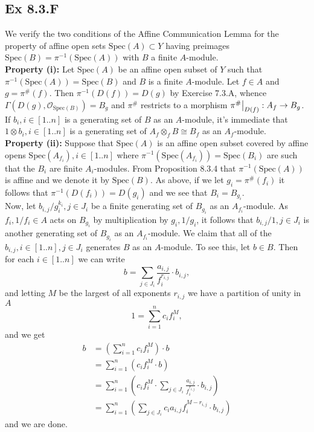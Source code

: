 \documentclass{article}
\newcommand\restr[2]{{%
  \left.\kern-\nulldelimiterspace %
  #1 %
  \vphantom{\big|} %
  \right|_{#2} %
  }}
\theoremstyle{definition}
\newcommand{\oo}{\mathcal{O}}
\newcommand{\osp}[1]{\oo_{\Spec\left(#1\right)}}
\newcommand{\Spec}{\text{Spec}}
\begin{document}
\subsection*{Ex 8.3.F}

We verify the two conditions of the Affine Communication Lemma for the property
of affine open sets $\Spec(A) \subset Y$ having preimages $\Spec(B) =
\pi^{-1}(\Spec(A))$ with $B$ a finite $A$-module. \\

\textbf{Property (i): }
Let $\Spec(A)$ be an affine open subset of $Y$ such that $\pi^{-1}(\Spec(A)) =
\Spec(B)$ and $B$ is a finite $A$-module. Let $f \in A$ and $g = \pi^{\#}(f)$.
Then $\pi^{-1}(D(f)) = D(g)$ by Exercise 7.3.A, whence $\Gamma(D(g), \osp{B}) =
B_g$ and $\pi^{\#}$ restricts to a morphism $\restr{\pi^{\#}}{D(f)} : A_f \to
B_g$. If $b_i, i \in [1..n]$ is a generating set of $B$ as an $A$-module, it's
immediate that $1 \otimes b_i, i \in [1..n]$ is a generating set of $A_f
\otimes_f B \cong B_f$ as an $A_f$-module. \\

\textbf{Property (ii): }
Suppose that $\Spec(A)$ is an affine open subset covered by affine opens
$\Spec(A_{f_i}), i \in [1..n]$ where $\pi^{-1}(\Spec(A_{f_i})) = \Spec(B_i)$
are such that the $B_i$ are finite $A_i$-modules. From Proposition 8.3.4 that
$\pi^{-1}(\Spec(A))$ is affine and we denote it by $\Spec(B)$. As above, if we
let $g_i = \pi^{\#}(f_i)$ it follows that $\pi^{-1}(D(f_i)) = D(g_i)$ and we
see that $B_i = B_{g_i}$. \\ 

Now, let $b_{i, j}/g_i^{k_i}, j \in J_i$ be a finite generating set of
$B_{g_i}$ as an $A_{f_i}$-module. As $f_i, 1/f_i \in A$ acts on $B_{g_i}$ by
multiplication by $g_i, 1/g_i$, it follows that $b_{i, j}/1, j \in J_i$ is
another generating set of $B_{g_i}$ as an $A_{f_i}$-module. We claim that all
of the $b_{i, j}, i \in [1..n], j \in J_i$ generates $B$ as an $A$-module. To see this,
let $b \in B$. Then for each $i \in [1..n]$ we can write 
\[
    b = \sum_{j \in J_i} \frac{a_{i, j}}{f_{i}^{r_{i, j}}} \cdot b_{i, j},
\]
and letting $M$ be the largest of all exponents $r_{i, j}$ we have a partition
of unity in $A$
\[
    1 = \sum_{i = 1}^{n} c_i f_i^{M},
\]
and we get
\begin{align*}
    b
    &=
    \left(\sum_{i = 1}^{n} c_i f_i^{M}\right)
    \cdot 
    b \\
    &=
    \sum_{i = 1}^{n} \left(c_i f_i^{M} \cdot b\right) \\
    &=
    \sum_{i = 1}^{n} \left(
        c_i f_i^{M} 
        \cdot 
        \sum_{j \in J_i} \frac{a_{i, j}}{f_{i}^{r_{i, j}}} \cdot b_{i, j}
    \right) \\
    &=
    \sum_{i = 1}^{n} \left(
        \sum_{j \in J_i} c_i a_{i, j}f_{i}^{M - r_{i, j}} \cdot b_{i, j}
    \right) 
\end{align*}
and we are done.
\end{document}
